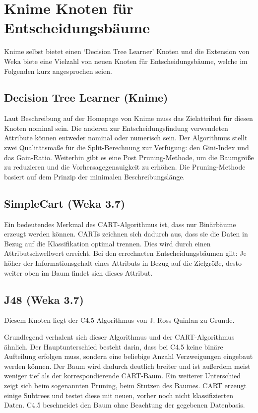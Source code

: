 \documentclass[12pt,					%
							 oneside,			%
							 a4paper,			%
							 halfparskip,		%
							 liststotoc,			%
							 bibtotoc,			%
							 fleqn,				%
							 pointlessnumbers]	%
							 {scrreprt}
\begin{document}
	\section{Knime Knoten für Entscheidungsbäume}\label{tree:dec:nodes}
		Knime selbst bietet einen `Decision Tree Learner' Knoten und die Extension von Weka biete eine Vielzahl von neuen Knoten für Entscheidungsbäume, welche im Folgenden kurz angesprochen seien.
	
		\subsection{Decision Tree Learner (Knime)}
			Laut Beschreibung auf der Homepage von Knime muss das Zielattribut für diesen Knoten nominal sein. Die anderen zur Entscheidungsfindung verwendeten Attribute können entweder nominal oder numerisch sein. Der Algorithmus stellt zwei Qualitätsmaße für die Split-Berechnung zur Verfügung: den Gini-Index und das Gain-Ratio. Weiterhin gibt es eine Post Pruning-Methode, um die Baumgröße zu reduzieren und die Vorhersagegenauigkeit zu erhöhen. Die Pruning-Methode basiert auf dem Prinzip der minimalen Beschreibungslänge.\cite{DecTreeLearner}
		
		\subsection{SimpleCart (Weka 3.7)}
			Ein bedeutendes Merkmal des CART-Algorithmus ist, dass nur Binärbäume erzeugt werden können. CARTs zeichnen sich dadurch aus, dass sie die Daten in Bezug auf die Klassifikation optimal trennen. Dies wird durch einen Attributschwellwert erreicht. Bei den errechneten Entscheidungsbäumen gilt: Je höher der Informationsgehalt eines Attributs in Bezug auf die Zielgröße, desto weiter oben im Baum findet sich dieses Attribut.\cite{Breiman1983}
			
			
		\subsection{J48 (Weka 3.7)}
			Diesem Knoten liegt der C4.5 Algorithmus von J. Ross Quinlan zu Grunde.
			
			Grundlegend verhalent sich dieser Algorithmus und der CART-Algorithmus ähnlich. Der Hauptunterschied besteht darin, dass bei C4.5 keine binäre Aufteilung erfolgen muss, sondern eine beliebige Anzahl Verzweigungen eingebaut werden können. Der Baum wird dadurch deutlich breiter und ist außerdem meist weniger tief als der korrespondierende CART-Baum. Ein weiterer Unterschied zeigt sich beim sogenannten Pruning, beim Stutzen des Baumes. CART erzeugt einige Subtrees und testet diese mit neuen, vorher noch nicht klassifizierten Daten. C4.5 beschneidet den Baum ohne Beachtung der gegebenen Datenbasis.\cite{Salzberg1994}
			
\end{document}
